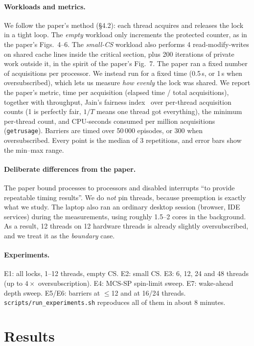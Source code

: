 \documentclass[10pt,twocolumn]{article}
\newcommand{\mcssp}{\textsc{MCS-SP}}
\begin{document}
\paragraph{Workloads and metrics.} We follow the paper's method (\S4.2): each thread acquires and
releases the lock in a tight loop. The \emph{empty} workload only increments the protected counter, as in
the paper's Figs.~4--6. The \emph{small-CS} workload also performs 4 read-modify-writes on shared cache lines
inside the critical section, plus 200 iterations of private work outside it, in the spirit of the paper's
Fig.~7. The paper ran a fixed number of acquisitions per processor. We instead run for a fixed time (0.5\,s,
or 1\,s when oversubscribed), which lets us measure \emph{how evenly} the lock was shared. We report the
paper's metric, time per acquisition (elapsed time / total acquisitions), together with throughput,
Jain's fairness index~\cite{jain} over per-thread acquisition counts (1 is perfectly fair, $1/T$ means one
thread got everything), the minimum per-thread count, and CPU-seconds consumed per million acquisitions
(\texttt{getrusage}). Barriers are timed over 50\,000 episodes, or 300 when oversubscribed. Every point
is the median of 3 repetitions, and error bars show the min--max range.

\paragraph{Deliberate differences from the paper.} The paper bound processes to processors and disabled
interrupts ``to provide repeatable timing results''. We do \emph{not} pin threads, because preemption is
exactly what we study. The laptop also ran an ordinary desktop session (browser, IDE services) during the
measurements, using roughly 1.5--2 cores in the background. As a result, 12 threads on 12 hardware threads is
already slightly oversubscribed, and we treat it as the \emph{boundary} case.

\paragraph{Experiments.} E1: all locks, 1--12 threads, empty CS. E2: small CS. E3: 6, 12, 24 and 48
threads (up to $4\times$ oversubscription). E4: \mcssp{} spin-limit sweep. E7: wake-ahead depth sweep.
E5/E6: barriers at $\le$12 and at 16/24 threads. \texttt{scripts/run\_experiments.sh} reproduces all
of them in about 8 minutes.

\section{Results}
\label{sec:results}
\end{document}
